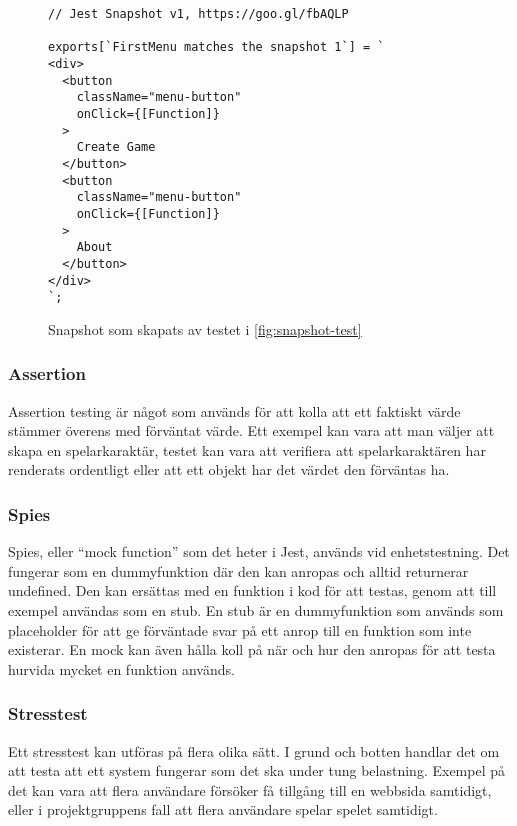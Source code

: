 \lstset{language=Java}
\begin{figure}[h]
  \center
  \begin{minipage}[c]{5cm}
    \begin{lstlisting}
// Jest Snapshot v1, https://goo.gl/fbAQLP

exports[`FirstMenu matches the snapshot 1`] = `
<div>
  <button
    className="menu-button"
    onClick={[Function]}
  >
    Create Game
  </button>
  <button
    className="menu-button"
    onClick={[Function]}
  >
    About
  </button>
</div>
`;

    \end{lstlisting}
  \end{minipage}

  \caption[Snapshot som skapats av test]{Snapshot som skapats av testet i \ref{fig:snapshot-test}}
  \label{fig:snapshot-shot}
\end{figure}
\pagebreak

\subsubsection{Assertion}
Assertion testing är något som används för att kolla att ett faktiskt värde stämmer överens med förväntat värde. Ett exempel kan vara att man väljer att skapa en spelarkaraktär, testet kan vara att verifiera att spelarkaraktären har renderats ordentligt eller att ett objekt har det värdet den förväntas ha. 
\subsubsection{Spies}
Spies, eller ``mock function'' \cite{bib-mock} som det heter i Jest, används vid enhetstestning. Det fungerar som en dummyfunktion där den kan anropas och alltid returnerar undefined. Den kan ersättas med en funktion i kod för att testas, genom att till exempel användas som en stub. En stub är en dummyfunktion som används som placeholder för att ge förväntade svar på ett anrop till en funktion som inte existerar. En mock kan även hålla koll på när och hur den anropas för att testa hurvida mycket en funktion används.

\subsubsection{Stresstest}
Ett stresstest kan utföras på flera olika sätt. I grund och botten handlar det om att testa att ett system fungerar som det ska under tung belastning. Exempel på det kan vara att flera användare försöker få tillgång till en webbsida samtidigt, eller i projektgruppens fall att flera användare spelar spelet samtidigt. 

